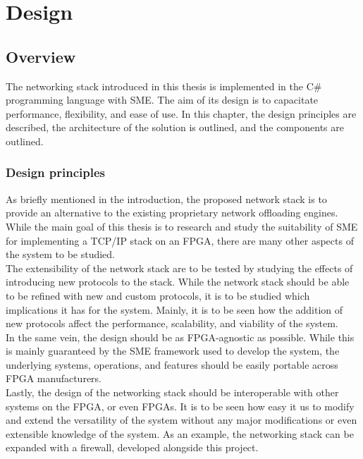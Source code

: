 \chapter{Design}

\section{Overview}
The networking stack introduced in this thesis is implemented in the C\# 
programming language with SME. The aim of its design is to capacitate performance,
flexibility, and ease of use. In this chapter, the design principles are 
described, the architecture of the solution is outlined, and the components are
outlined.


\subsection{Design principles}
As briefly mentioned in the introduction, the proposed network stack is to 
provide an alternative to the existing proprietary network offloading engines.
While the main goal of this thesis is to research and study the suitability of 
SME for implementing a TCP/IP stack on an FPGA, there are many other aspects of the 
system to be studied.\\
The extensibility of the network stack are to be tested by studying the effects 
of introducing new protocols to the stack. While the network stack should be 
able to be refined with new and custom protocols, it is to be studied which 
implications it has for the system. Mainly, it is to be seen how the addition 
of new protocols affect the performance, scalability, and viability of the 
system.\\
In the same vein, the design should be as FPGA-agnostic as possible. While this is 
mainly guaranteed by the SME framework used to develop the system, the underlying
systems, operations, and features should be easily portable across FPGA manufacturers.\\
Lastly, the design of the networking stack should be interoperable with other 
systems on the FPGA, or even FPGAs. It is to be seen how easy it us to modify
and extend the versatility of the system without any major modifications or 
even extensible knowledge of the system. As an example, the networking stack 
can be expanded with a firewall, developed alongside this project. 


